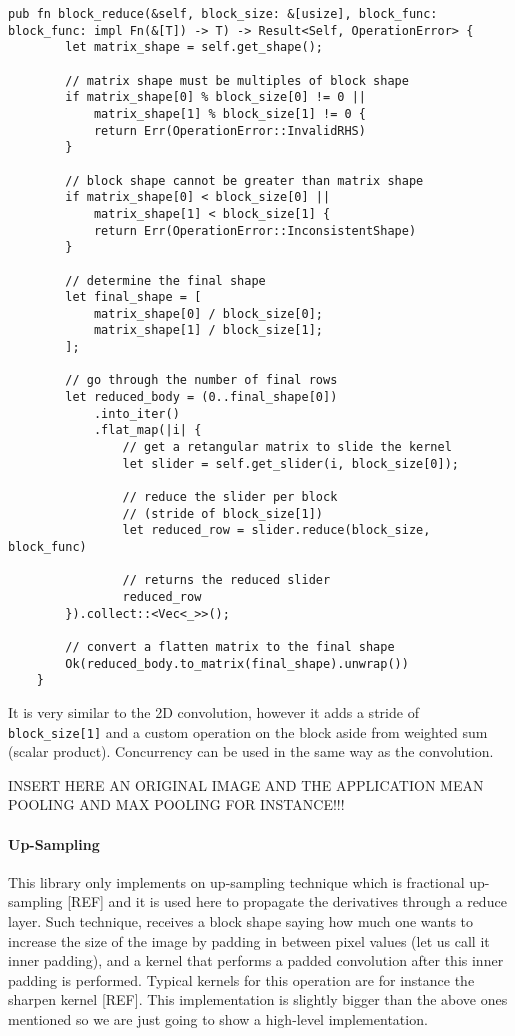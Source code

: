 \begin{lstlisting}[caption=Implementation in Rust of Block Reduce Operation.]
	pub fn block_reduce(&self, block_size: &[usize], block_func: block_func: impl Fn(&[T]) -> T) -> Result<Self, OperationError> {
		let matrix_shape = self.get_shape();
		
		// matrix shape must be multiples of block shape
		if matrix_shape[0] % block_size[0] != 0 || 
			matrix_shape[1] % block_size[1] != 0 {
			return Err(OperationError::InvalidRHS)
		}
		
		// block shape cannot be greater than matrix shape
		if matrix_shape[0] < block_size[0] || 
			matrix_shape[1] < block_size[1] {
			return Err(OperationError::InconsistentShape)
		}
		
		// determine the final shape
		let final_shape = [
			matrix_shape[0] / block_size[0];
			matrix_shape[1] / block_size[1];
		];
		
		// go through the number of final rows
		let reduced_body = (0..final_shape[0])
			.into_iter()
			.flat_map(|i| {
				// get a retangular matrix to slide the kernel
				let slider = self.get_slider(i, block_size[0]);
			
				// reduce the slider per block 
				// (stride of block_size[1])
				let reduced_row = slider.reduce(block_size, block_func)
			
				// returns the reduced slider
				reduced_row
		}).collect::<Vec<_>>();
		
		// convert a flatten matrix to the final shape
		Ok(reduced_body.to_matrix(final_shape).unwrap())
	}
\end{lstlisting}

It is very similar to the 2D convolution, however it adds a stride of \texttt{block\_size[1]} and a custom operation on the block aside from weighted sum (scalar product). Concurrency can be used in the same way as the convolution.

INSERT HERE AN ORIGINAL IMAGE AND THE APPLICATION MEAN POOLING AND MAX POOLING FOR INSTANCE!!!

\paragraph{Up-Sampling}

This library only implements on up-sampling technique which is fractional up-sampling [REF] and it is used here to propagate the derivatives through a reduce layer. Such technique, receives a block shape saying how much one wants to increase the size of the image by padding in between pixel values (let us call it inner padding), and a kernel that performs a padded convolution after this inner padding is performed. Typical kernels for this operation are for instance the sharpen kernel [REF]. This implementation is slightly bigger than the above ones mentioned so we are just going to show a high-level implementation.

